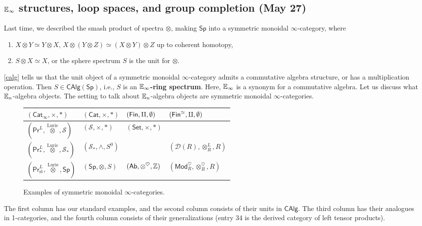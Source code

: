 \subsection{$\mathbb{E}_{\infty}$ structures, loop spaces, and group completion (May 27)}
Last time, we described the smash product of spectra $\otimes $, making $\mathsf{Sp} $ into a symmetric monoidal $\infty$-category, where 
\begin{enumerate}[label=(\roman*)]
\setlength\itemsep{-.2em}
    \item $X\otimes Y \simeq  Y \otimes X$, $X\otimes (Y\otimes Z) \simeq (X\otimes Y)\otimes Z$ up to coherent homotopy,
    \item $S \otimes X \simeq  X$, or the sphere spectrum $S$ is the unit for $\otimes$.
\end{enumerate}
\cref{calg} tells us that the unit object of a symmetric monoidal $\infty$-category admits a commutative algebra structure, or has a multiplication operation. Then $S \in \mathsf{CAlg} (\mathsf{Sp} )$, i.e., $S$ is an $\mathbf { \mathbb{E} _{\infty}}$\textbf{-ring spectrum}. Here, $\mathbb{E}_{\infty}$ is a synonym for a commutative algebra. Let us discuss what $\mathbb{E}_n $-algebra objects. The setting to talk about $\mathbb{E}_n $-algebra objects are symmetric monoidal $\infty$-categories.
   \begin{figure}[H]
       \centering
   \begin{tabular}{|| l | l | l | l  ||} 
       \hline$(\mathsf{Cat} _{\infty}, \times , *)$ &$(\mathsf{Cat} , \times ,*)$ & $(\mathsf{Fin} ,\amalg,\emptyset)$& $(\mathsf{Fin} ^{\simeq },\amalg,\emptyset)$\\ \hline
       $(\mathsf{Pr} ^L,\overset{\text{Lurie}}{\otimes} ,\mathcal{S} )$ & $(\mathcal{S} ,\times ,*)$ &$(\mathsf{Set} ,\times ,*)$ & \\ \hline
       $(\mathsf{Pr} _*^L , \overset{\text{Lurie} }{\otimes} ,\mathcal{S} _*) $ & $(\mathcal{S} _*, \wedge ,S^0)$ & & $(\mathcal{D }(R), \otimes ^L_R, R) $ \\ \hline
       $(\mathsf{Pr} _{\mathrm{st}}^L, \overset{\text{Lurie} }{\otimes} ,\mathsf{Sp} ) $ & $(\mathsf{Sp} ,\otimes ,S)$ & $(\mathsf{Ab} , \otimes ^{\heartsuit},\mathbb{Z})$ & $(\mathsf{Mod} _R ^{\heartsuit},\otimes _R ^{\heartsuit}, R)$\\ \hline
   \end{tabular}
   \caption{Examples of symmetric monoidal $\infty$-categories.} 
   \label{smic} 
   \end{figure}
   The first column has our standard examples, and the second column consists of their units in  $\mathsf{CAlg} $. The third column has their analogues in 1-categories, and the fourth column consists of their generalizations (entry 34 is the derived category of left tensor products).


